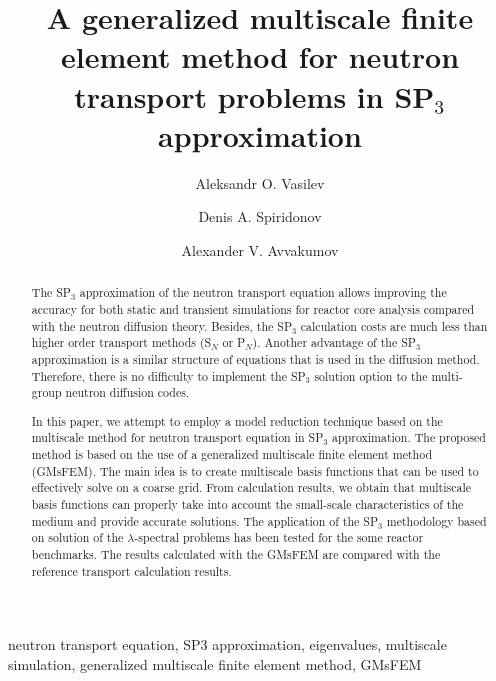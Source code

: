 \documentclass[preprint]{elsarticle}
\begin{document}
\begin{frontmatter}
\title{A generalized multiscale finite element method for neutron transport problems in SP$_3$ approximation}

\author[nefu]{Aleksandr O. Vasilev}

\author[nefu]{Denis A. Spiridonov}

\author[ki]{Alexander V. Avvakumov}

\address[nefu]{North-Eastern Federal University, 58, Belinskogo, Yakutsk, Russia}
\address[ki]{National Research Center \emph{Kurchatov Institute},  1, Sq. Academician Kurchatov, Moscow, Russia}


\begin{abstract}
The SP$_3$ approximation of the neutron transport equation allows improving the accuracy for both static and transient simulations for reactor core analysis compared with the neutron diffusion theory. 
Besides, the SP$_3$ calculation costs are much less than higher order transport methods (S$_N$ or P$_N$).
Another advantage of the SP$_3$ approximation is a similar structure of equations that is used in the diffusion method. 
Therefore, there is no difficulty to implement the SP$_3$ solution option to the multi-group neutron diffusion codes. 

In this paper, we attempt to employ a model reduction technique based on the multiscale method for neutron transport equation in SP$_3$ approximation. 
The proposed method is based on the use of a generalized multiscale finite element method (GMsFEM).
The main idea is to create multiscale basis functions that can be used to effectively solve on a coarse grid.
From calculation results, we obtain that multiscale basis functions can properly take into account the small-scale characteristics of the medium and provide accurate solutions. 
The application of the SP$_3$ methodology based on solution of the $\lambda$-spectral problems has been tested for the some reactor benchmarks.
The results calculated with the GMsFEM are compared with the reference transport calculation results.
\end{abstract}

\begin{keyword}
neutron transport equation, SP3 approximation, eigenvalues, multiscale simulation, generalized multiscale finite element method, GMsFEM
\end{keyword}

\end{frontmatter}
\end{document}
